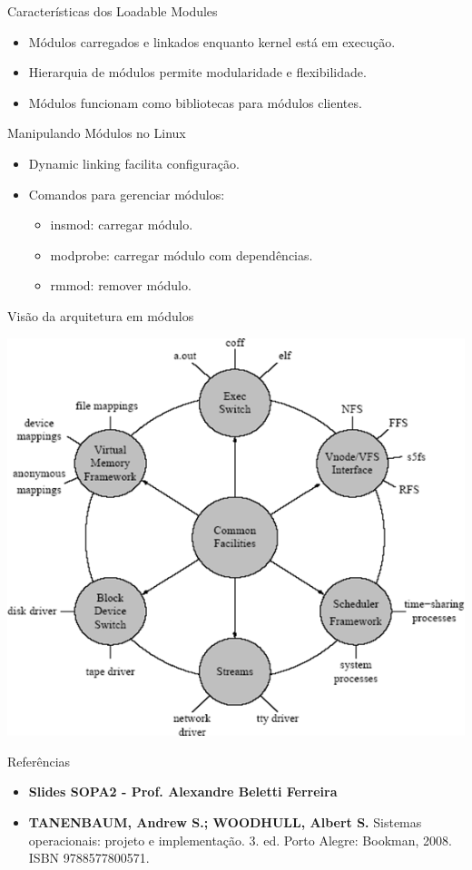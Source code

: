 \documentclass{beamer}
\begin{document}
\begin{frame}{Características dos Loadable Modules}
    \begin{itemize}
        \item Módulos carregados e linkados enquanto kernel está em execução.
        \item Hierarquia de módulos permite modularidade e flexibilidade.
        \item Módulos funcionam como bibliotecas para módulos clientes.
    \end{itemize}
\end{frame}

\begin{frame}{Manipulando Módulos no Linux}
    \begin{itemize}
        \item Dynamic linking facilita configuração.
        \item Comandos para gerenciar módulos:
            \begin{itemize}
                \item insmod: carregar módulo.
                \item modprobe: carregar módulo com dependências.
                \item rmmod: remover módulo.
            \end{itemize}
    \end{itemize}
\end{frame}
\begin{frame}{Visão da arquitetura em módulos}
    
    \begin{center}
        \includegraphics[width=0.5\linewidth]{assets/aula-tads-sope/SO-unix-linux-4.png}
    \end{center}
\end{frame}




\begin{frame}{Referências }\justifying
    \begin{itemize}
        \item \textbf{Slides SOPA2 - Prof. Alexandre Beletti Ferreira}
        \item \textbf{TANENBAUM, Andrew S.; WOODHULL, Albert S.} Sistemas operacionais: projeto e implementação. 3. ed. Porto Alegre: Bookman, 2008. ISBN 9788577800571.
    \end{itemize}
\end{frame}
\end{document}
